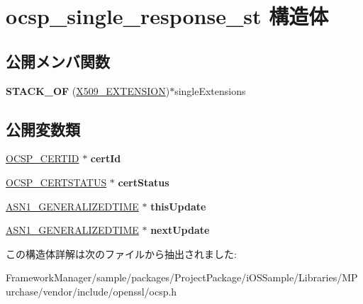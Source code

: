 \hypertarget{structocsp__single__response__st}{}\section{ocsp\+\_\+single\+\_\+response\+\_\+st 構造体}
\label{structocsp__single__response__st}
\subsection*{公開メンバ関数}
\begin{DoxyCompactItemize}
\item 
\hypertarget{structocsp__single__response__st_ae3411f84f872a66b09eff966c3c77c0d}{}{\bfseries S\+T\+A\+C\+K\+\_\+\+O\+F} (\hyperlink{struct_x509__extension__st}{X509\+\_\+\+E\+X\+T\+E\+N\+S\+I\+O\+N})$\ast$single\+Extensions\label{structocsp__single__response__st_ae3411f84f872a66b09eff966c3c77c0d}

\end{DoxyCompactItemize}
\subsection*{公開変数類}
\begin{DoxyCompactItemize}
\item 
\hypertarget{structocsp__single__response__st_af26393e48e4a9f18955ec0b1785961fb}{}\hyperlink{structocsp__cert__id__st}{O\+C\+S\+P\+\_\+\+C\+E\+R\+T\+I\+D} $\ast$ {\bfseries cert\+Id}\label{structocsp__single__response__st_af26393e48e4a9f18955ec0b1785961fb}

\item 
\hypertarget{structocsp__single__response__st_a2d8ac66aea93406dbf48c722c8f2d185}{}\hyperlink{structocsp__cert__status__st}{O\+C\+S\+P\+\_\+\+C\+E\+R\+T\+S\+T\+A\+T\+U\+S} $\ast$ {\bfseries cert\+Status}\label{structocsp__single__response__st_a2d8ac66aea93406dbf48c722c8f2d185}

\item 
\hypertarget{structocsp__single__response__st_a1ed7424e4d254f4af8499303dce9ffb2}{}\hyperlink{structasn1__string__st}{A\+S\+N1\+\_\+\+G\+E\+N\+E\+R\+A\+L\+I\+Z\+E\+D\+T\+I\+M\+E} $\ast$ {\bfseries this\+Update}\label{structocsp__single__response__st_a1ed7424e4d254f4af8499303dce9ffb2}

\item 
\hypertarget{structocsp__single__response__st_a54c06d485bae1de66d1e0b58403b2e25}{}\hyperlink{structasn1__string__st}{A\+S\+N1\+\_\+\+G\+E\+N\+E\+R\+A\+L\+I\+Z\+E\+D\+T\+I\+M\+E} $\ast$ {\bfseries next\+Update}\label{structocsp__single__response__st_a54c06d485bae1de66d1e0b58403b2e25}

\end{DoxyCompactItemize}


この構造体詳解は次のファイルから抽出されました\+:\begin{DoxyCompactItemize}
\item 
Framework\+Manager/sample/packages/\+Project\+Package/i\+O\+S\+Sample/\+Libraries/\+M\+Purchase/vendor/include/openssl/ocsp.\+h\end{DoxyCompactItemize}
